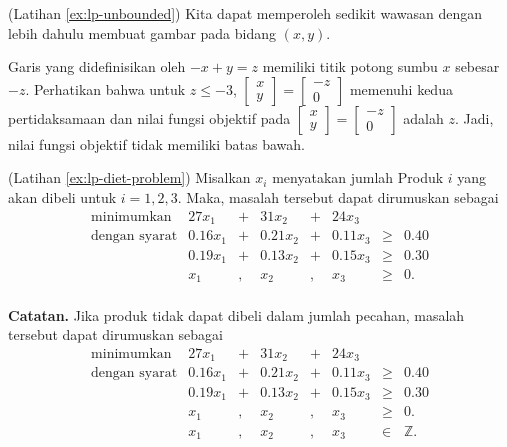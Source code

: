 \begin{solution}(Latihan \ref{ex:lp-unbounded})
Kita dapat memperoleh sedikit wawasan dengan lebih dahulu membuat gambar pada
bidang \((x,y)\).

Garis yang didefinisikan oleh \(-x + y = z\) memiliki titik potong sumbu \(x\)
sebesar \(-z\). Perhatikan bahwa untuk \(z \leq -3\),
\(\begin{bmatrix} x\\y \end{bmatrix} = \begin{bmatrix} -z\\ 0\end{bmatrix}\)
memenuhi kedua pertidaksamaan dan nilai fungsi objektif pada
\(\begin{bmatrix} x\\y \end{bmatrix} = \begin{bmatrix} -z\\ 0\end{bmatrix}\)
adalah \(z\). Jadi, nilai fungsi objektif tidak memiliki batas bawah.
\end{solution}

\begin{solution}(Latihan \ref{ex:lp-diet-problem})
Misalkan \(x_i\) menyatakan jumlah Produk \(i\) yang akan dibeli untuk
\(i = 1,2,3\). Maka, masalah tersebut dapat dirumuskan sebagai
\[
\begin{array}{rrcrcrll}
\text{minimumkan } & 27 x_1 & + & 31 x_2 & + & 24 x_3 \\
\text{dengan syarat}
& 0.16 x_1 & + & 0.21 x_2 & + & 0.11 x_3 & \geq & 0.40 \\
& 0.19 x_1 & + & 0.13 x_2 & + & 0.15 x_3 & \geq & 0.30 \\
& x_1 & , & x_2 & , & x_3 & \geq & 0. \\
\end{array}
\]

\textbf{Catatan.} Jika produk tidak dapat dibeli dalam jumlah pecahan,
masalah tersebut dapat dirumuskan sebagai
\[
\begin{array}{rrcrcrll}
\text{minimumkan } & 27 x_1 & + & 31 x_2 & + & 24 x_3 \\
\text{dengan syarat}
& 0.16 x_1 & + & 0.21 x_2 & + & 0.11 x_3 & \geq & 0.40 \\
& 0.19 x_1 & + & 0.13 x_2 & + & 0.15 x_3 & \geq & 0.30 \\
& x_1 & , & x_2 & , & x_3 & \geq & 0. \\
& x_1 & , & x_2 & , & x_3 & \in & \mathbb{Z}. \\
\end{array}
\]
\end{solution}

